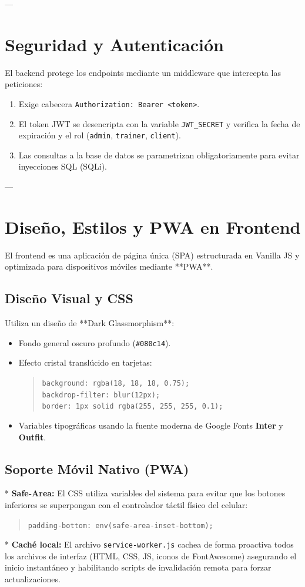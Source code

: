 \documentclass[11pt]{article}
\begin{document}
---

\section{Seguridad y Autenticación}
El backend protege los endpoints mediante un middleware que intercepta las peticiones:
\begin{enumerate}
    \item Exige cabecera \texttt{Authorization: Bearer <token>}.
    \item El token JWT se desencripta con la variable \texttt{JWT\_SECRET} y verifica la fecha de expiración y el rol (\texttt{admin}, \texttt{trainer}, \texttt{client}).
    \item Las consultas a la base de datos se parametrizan obligatoriamente para evitar inyecciones SQL (SQLi).
\end{enumerate}

---

\section{Diseño, Estilos y PWA en Frontend}
El frontend es una aplicación de página única (SPA) estructurada en Vanilla JS y optimizada para dispositivos móviles mediante **PWA**.

\subsection{Diseño Visual y CSS}
Utiliza un diseño de **Dark Glassmorphism**:
\begin{itemize}
    \item Fondo general oscuro profundo (\texttt{\#080c14}).
    \item Efecto cristal translúcido en tarjetas:
    \begin{quote}\footnotesize
        \texttt{background: rgba(18, 18, 18, 0.75);\\
        backdrop-filter: blur(12px);\\
        border: 1px solid rgba(255, 255, 255, 0.1);}
    \end{quote}
    \item Variables tipográficas usando la fuente moderna de Google Fonts \textbf{Inter} y \textbf{Outfit}.
\end{itemize}

\subsection{Soporte Móvil Nativo (PWA)}
*   \textbf{Safe-Area:} El CSS utiliza variables del sistema para evitar que los botones inferiores se superpongan con el controlador táctil físico del celular:
    \begin{quote}\footnotesize
        \texttt{padding-bottom: env(safe-area-inset-bottom);}
    \end{quote}
*   \textbf{Caché local:} El archivo \texttt{service-worker.js} cachea de forma proactiva todos los archivos de interfaz (HTML, CSS, JS, iconos de FontAwesome) asegurando el inicio instantáneo y habilitando scripts de invalidación remota para forzar actualizaciones.
\end{document}
